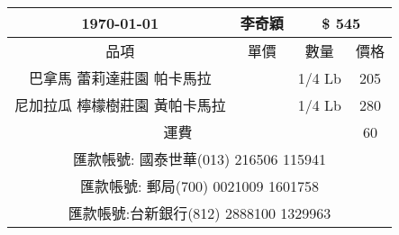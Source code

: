 \documentclass[14pt,a4paper,landspace,landscape]{extarticle}
\begin{document}
\begin{tabular}{ |c|c|c|c|}\hline
 \large \today & { \Large  李奇穎} & \multicolumn{2}{c|}{\large \$ \Large 545} \\\hline
  品項&單價&數量&價格\\\hline
巴拿馬  蕾莉達莊園 帕卡馬拉 &   & 1/4 Lb & 205\\ \hline
尼加拉瓜  檸檬樹莊園 黃帕卡馬拉 &   & 1/4 Lb & 280\\ \hline
\multicolumn{3}{|c|}{運費} & 60\\\hline\hline\hline\multicolumn{4}{|c|}{\large 匯款帳號: 國泰世華(013) 216506 115941}\\\hline\multicolumn{4}{|c|}{\large 匯款帳號: 郵局(700) 0021009 1601758}\\\hline\multicolumn{4}{|c|}{\large 匯款帳號:台新銀行(812) 2888100 1329963}\\\hline
\end{tabular}
\bigskip\bigskip\bigskip
\end{document}
